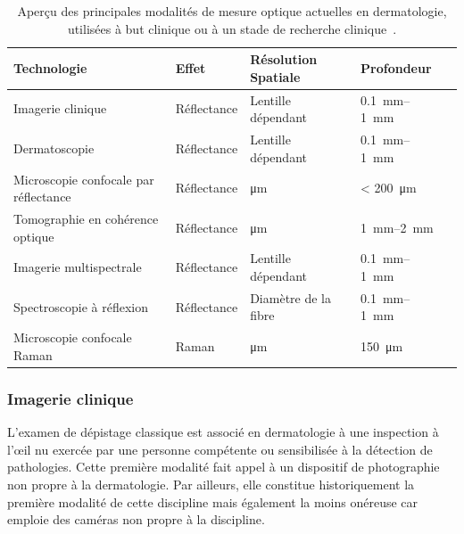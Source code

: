 \begin{table}[H]
\begin{tabular}{lllll}
    \toprule
    \textbf{Technologie}                        & \textbf{Effet}    & \textbf{Résolution Spatiale} & \textbf{Profondeur}                \\ \hline
    Imagerie clinique                           & Réflectance       & Lentille dépendant           & \SIrange{0.1}{1}{\milli\metre}     \\
    Dermatoscopie                               & Réflectance       & Lentille dépendant           & \SIrange{0.1}{1}{\milli\metre}     \\
    Microscopie confocale par réflectance       & Réflectance       & \si{\micro\metre}            & \textless{} \SI{200}{\micro\metre} \\
    Tomographie en cohérence optique            & Réflectance       & \si{\micro\metre}            & \SIrange{1}{2}{\milli\metre}       \\
    Imagerie multispectrale                     & Réflectance       & Lentille dépendant           & \SIrange{0.1}{1}{\milli\metre}     \\
    Spectroscopie à réflexion                   & Réflectance       & Diamètre de la fibre         & \SIrange{0.1}{1}{\milli\metre}     \\
    Microscopie confocale Raman                 & Raman             & \si{\micro\metre}            & \SI{150}{\micro\metre}             \\
    \bottomrule
\end{tabular}
\caption{Aperçu des principales modalités de mesure optique actuelles en dermatologie, utilisées à but clinique ou à un stade de recherche clinique~\cite{Kollias2002}.}
\label{tab:light_absorption}
\end{table}\par

\subsubsection{Imagerie clinique}
L’examen de dépistage classique est associé en dermatologie à une inspection à l’œil nu exercée par une personne compétente ou sensibilisée à la détection de pathologies. Cette première modalité fait appel à un dispositif de photographie non propre à la dermatologie. Par ailleurs, elle constitue historiquement la première modalité de cette discipline mais également la moins onéreuse car emploie des caméras non propre à la discipline.\par

